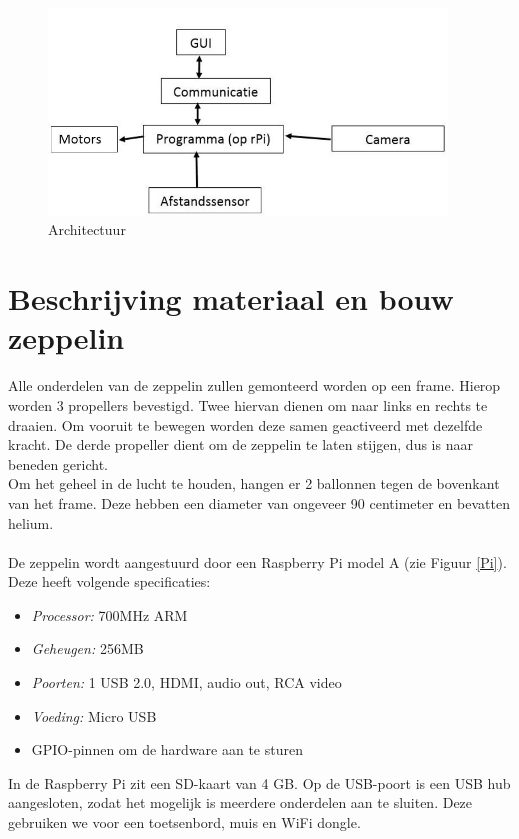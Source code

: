 \documentclass[tt]{penoverslag}
\begin{document}
\begin{figure}[ht!]
\centering
\includegraphics[height=55mm]{Schema.jpg}
\caption{Architectuur}
\label{schema}
\end{figure}


\section{Beschrijving materiaal en bouw zeppelin}
Alle onderdelen van de zeppelin zullen gemonteerd worden op een frame. Hierop worden 3 propellers bevestigd. Twee hiervan dienen om naar links en rechts te draaien. Om vooruit te bewegen worden deze samen geactiveerd met dezelfde kracht. De derde propeller dient om de zeppelin te laten stijgen, dus is naar beneden gericht. ~\\

Om het geheel in de lucht te houden, hangen er 2 ballonnen tegen de bovenkant van het frame. Deze hebben een diameter van ongeveer 90 centimeter en bevatten helium. \\
\\
De zeppelin wordt aangestuurd door een Raspberry Pi model A (zie Figuur \ref{Pi}). Deze heeft volgende specificaties: 
\begin{itemize}
	\item \emph{Processor:} 700MHz ARM
	\item \emph{Geheugen:} 256MB 
	\item \emph{Poorten:} 1 USB 2.0, HDMI, audio out, RCA video
	\item \emph{Voeding:} Micro USB
	\item GPIO-pinnen om de hardware aan te sturen
\end{itemize}

In de Raspberry Pi zit een SD-kaart van 4 GB. Op de USB-poort is een USB hub aangesloten, zodat het mogelijk is meerdere onderdelen aan te sluiten. Deze gebruiken we voor een toetsenbord, muis en WiFi dongle. \\
\end{document}
